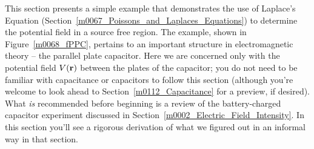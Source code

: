 

\label{m0068_V_Within_Parallel_Plate_Cap_Using_Laplaces_Equation} %

This section presents a simple example that demonstrates the use of Laplace's Equation 
(Section~\ref{m0067_Poissons_and_Laplaces_Equations}) to determine the potential field in a source free region.
The example, shown in Figure~\ref{m0068_fPPC}, pertains to an important structure in electromagnetic theory -- the parallel plate capacitor.
Here we are concerned only with the potential field $V({\bf r})$ between the plates of the capacitor; you do not need to be familiar with capacitance or capacitors to follow this section (although you're welcome to look ahead to Section~\ref{m0112_Capacitance} for a preview, if desired). 
What \emph{is} recommended before beginning is a review of the battery-charged capacitor experiment discussed in Section~\ref{m0002_Electric_Field_Intensity}. In this section you'll see a rigorous derivation of what we figured out in an informal way in that section. 


